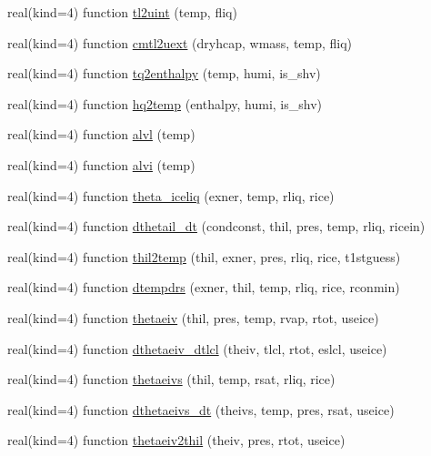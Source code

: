 \begin{DoxyCompactItemize}
real(kind=4) function \hyperlink{namespacetherm__lib_a3ad59a4037ed8ed57532b8ea630a7df1}{tl2uint} (temp, fliq)
\item 
real(kind=4) function \hyperlink{namespacetherm__lib_a2db60e1f300fadcd09ef451059aa571b}{cmtl2uext} (dryhcap, wmass, temp, fliq)
\item 
real(kind=4) function \hyperlink{namespacetherm__lib_addd05382298a8487d09d7f6e2664dd62}{tq2enthalpy} (temp, humi, is\+\_\+shv)
\item 
real(kind=4) function \hyperlink{namespacetherm__lib_ad10129810640ad98a16dde22a0c244b8}{hq2temp} (enthalpy, humi, is\+\_\+shv)
\item 
real(kind=4) function \hyperlink{namespacetherm__lib_a543f4c6ab155d99ad9a5002a8143a654}{alvl} (temp)
\item 
real(kind=4) function \hyperlink{namespacetherm__lib_a4fbc9bf6cc7bc66ef4c68393149d7288}{alvi} (temp)
\item 
real(kind=4) function \hyperlink{namespacetherm__lib_a15a79fc7dd2aaabe7bc7da287e531324}{theta\+\_\+iceliq} (exner, temp, rliq, rice)
\item 
real(kind=4) function \hyperlink{namespacetherm__lib_aece12bd6eb1571019dc09b9968d7e07e}{dthetail\+\_\+dt} (condconst, thil, pres, temp, rliq, ricein)
\item 
real(kind=4) function \hyperlink{namespacetherm__lib_ac1f38c4afbbc3cf5a540d4e87c8b22c8}{thil2temp} (thil, exner, pres, rliq, rice, t1stguess)
\item 
real(kind=4) function \hyperlink{namespacetherm__lib_a98f9f548762461093dfbe7604fcc5601}{dtempdrs} (exner, thil, temp, rliq, rice, rconmin)
\item 
real(kind=4) function \hyperlink{namespacetherm__lib_a2523d158beee975faaed4552724aae65}{thetaeiv} (thil, pres, temp, rvap, rtot, useice)
\item 
real(kind=4) function \hyperlink{namespacetherm__lib_a46f478124e2b8b34a4f64e13df4a9713}{dthetaeiv\+\_\+dtlcl} (theiv, tlcl, rtot, eslcl, useice)
\item 
real(kind=4) function \hyperlink{namespacetherm__lib_a59bae4be9ba9f862c7b58953f37a9be2}{thetaeivs} (thil, temp, rsat, rliq, rice)
\item 
real(kind=4) function \hyperlink{namespacetherm__lib_a2c2d9dff6ab1ea0e1385b7f94e322c26}{dthetaeivs\+\_\+dt} (theivs, temp, pres, rsat, useice)
\item 
real(kind=4) function \hyperlink{namespacetherm__lib_a567e8e6a001cab2a0991a88f7b7fc28f}{thetaeiv2thil} (theiv, pres, rtot, useice)

\end{DoxyCompactItemize}
